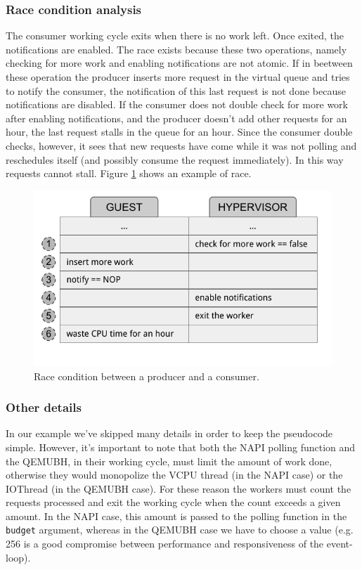 \subsubsection{Race condition analysis}
The consumer working cycle exits when there is no work left. Once exited, the notifications are enabled. The race exists because these
two operations, namely checking for more work and enabling notifications are not atomic. If in beetween these operation the producer
inserts more request in the virtual queue and tries to notify the consumer, the notification of this last request is not done because 
notifications are disabled. If the consumer does not double check for more work after enabling notifications, and the producer doesn't
add other requests for an hour, the last request stalls in the queue for an hour. Since the consumer double checks, however, it sees
that new requests have come while it was not polling and reschedules itself (and possibly consume the request immediately). In this
way requests cannot stall. Figure \ref{fig:race} shows an example of race.

\begin{figure}[bt]
\centering
\includegraphics[scale = 1.0]{race.pdf}
\caption{Race condition between a producer and a consumer.}
\label{fig:race}
\end{figure}


\subsubsection{Other details}
In our example we've skipped many details in order to keep the pseudocode simple. However, it's important to note that both the NAPI
polling function and the QEMUBH, in their working cycle, must limit the amount of work done, otherwise they would monopolize the VCPU
thread (in the NAPI case) or the IOThread (in the QEMUBH case). For these reason the workers must count the requests processed and
exit the working cycle when the count exceeds a given amount. In the NAPI case, this amount is passed to the polling function in the
\texttt{budget} argument, whereas in the QEMUBH case we have to choose a value (e.g. 256 is a good compromise between performance and
responsiveness of the event-loop).



